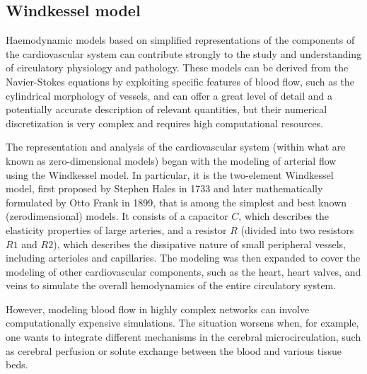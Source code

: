 \newpage

\subsection{Windkessel model}

Haemodynamic models based on simplified representations of the components of the cardiovascular system can contribute strongly to the study and understanding of circulatory physiology and pathology. 
These models can be derived from the Navier-Stokes equations by exploiting specific features of blood flow, such as the cylindrical morphology of vessels, and can offer a great level of detail and a potentially accurate description of relevant quantities, but their numerical discretization is very complex and requires high computational resources.

The representation and analysis of the cardiovascular system (within what are known as zero-dimensional models) began with the modeling of arterial flow using the Windkessel model. In particular, it is the two-element Windkessel model, first proposed by Stephen Hales in 1733 and later mathematically formulated by Otto Frank in 1899, that is among the simplest and best known (zerodimensional) models. It consists of a capacitor $C$, which describes the elasticity properties of large arteries, and a resistor $R$ (divided into two resistors $R1$ and $R2$), which describes the dissipative nature of small peripheral vessels, including arterioles and capillaries. The modeling was then expanded to cover the modeling of other cardiovascular components, such as the heart, heart valves, and veins to simulate the overall hemodynamics of the entire circulatory system.


However, modeling blood flow in highly complex networks can involve computationally expensive simulations. 
The situation worsens when, for example, one wants to integrate different mechanisms in the cerebral microcirculation, such as cerebral perfusion or solute exchange between the blood and various tissue beds.

